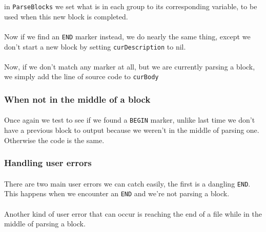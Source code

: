 \documentclass{article}
\begin{document}
in \texttt{ParseBlocks} we set what is in each group to its corresponding variable,
to be used when this new block is completed.

\paragraph{}
Now if we find an \texttt{END} marker instead, we do nearly the same thing, except we
don't start a new block by setting \texttt{curDescription} to nil.


\paragraph{}
Now, if we don't match any marker at all, but we are currently parsing a block,
we simply add the line of source code to \texttt{curBody}


\subsubsection{When not in the middle of a block}

\paragraph{}
Once again we test to see if we found a \texttt{BEGIN} marker, unlike last time we don't
have a previous block to output because we weren't in the middle of parsing one.
Otherwise the code is the same.


\subsubsection{Handling user errors}

\paragraph{}
There are two main user errors we can catch easily, the first is a dangling \texttt{END}.
This happens when we encounter an \texttt{END} and we're not parsing a block.


\paragraph{}
Another kind of user error that can occur is reaching the end of a file while in
the middle of parsing a block.

\end{document}
